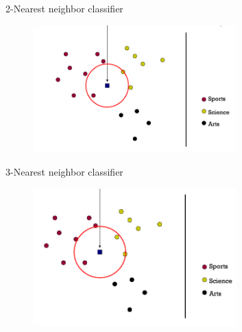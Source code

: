 \documentclass[serif, aspectratio=169]{beamer}
\begin{document}
\begin{frame}{2-Nearest neighbor classifier}
    \begin{figure}[h]
            \centering
            
            \includegraphics[width=0.7\textwidth]{pic/2NN.png}
            \end{figure}
\end{frame}
\begin{frame}{3-Nearest neighbor classifier}
    \begin{figure}[h]
            \centering
            
            \includegraphics[width=0.7\textwidth]{pic/3NN.png}
            \end{figure}
\end{frame}
\end{document}
